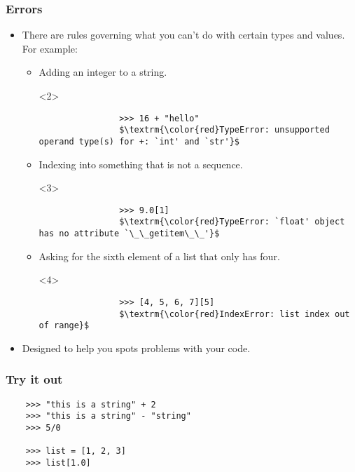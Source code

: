 \documentclass[notes]{beamer}
\begin{document}
\begin{frame}[fragile]
	\frametitle{Errors}
	
	\begin{itemize}
		\item There are rules governing what you can't do with certain types and values.
		\pause For example:
		\begin{itemize}
			\item Adding an integer to a string.
			\begin{onlyenv}<2>
				\begin{lstlisting}
				>>> 16 + "hello"
				$\textrm{\color{red}TypeError: unsupported operand type(s) for +: `int' and `str'}$
				\end{lstlisting}
			\end{onlyenv}
			
			\pause
			
			\item Indexing into something that is not a sequence.
			\begin{onlyenv}<3>
				\begin{lstlisting}
				>>> 9.0[1]
				$\textrm{\color{red}TypeError: `float' object has no attribute `\_\_getitem\_\_'}$
				\end{lstlisting}
			\end{onlyenv}
			
			\pause
			
			\item Asking for the sixth element of a list that only has four.
			\begin{onlyenv}<4>
				\begin{lstlisting}
				>>> [4, 5, 6, 7][5]
				$\textrm{\color{red}IndexError: list index out of range}$
				\end{lstlisting}
			\end{onlyenv}
			
			\pause
		\end{itemize}
		\item Designed to help you spots problems with your code.
	\end{itemize}
\end{frame}

\begin{frame}[fragile]
	\frametitle{Try it out}

	\begin{lstlisting}
	>>> "this is a string" + 2
	>>> "this is a string" - "string"
	>>> 5/0
	
	>>> list = [1, 2, 3]
	>>> list[1.0]
	\end{lstlisting}
\end{frame}
\end{document}

